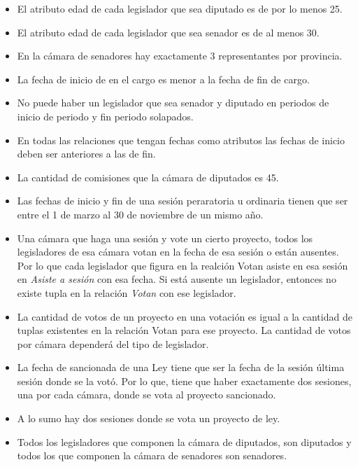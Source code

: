 \begin{itemize}
	\item El atributo edad de cada legislador que sea diputado es de por lo menos 25.
	\item El atributo edad de cada legislador que sea senador es de al menos 30.
	\item En la c\'amara de senadores hay exactamente 3 representantes por provincia.
	\item La fecha de inicio de en el cargo es menor a la fecha de fin de cargo.
	\item No puede haber un legislador que sea senador y diputado en periodos de
	 inicio de periodo y fin periodo solapados.
	
	\item En todas las relaciones que tengan fechas como atributos las fechas de inicio
	 deben ser anteriores a las de fin.
	
	\item La cantidad de comisiones que la c\'amara de diputados es 45.
	
	\item Las fechas de inicio y fin de una sesi\'on peraratoria u ordinaria tienen que ser entre el 1 de marzo al 30 de noviembre de un mismo a\~no.
	
	\item Una c\'amara que haga una sesi\'on y vote un cierto proyecto, todos los legisladores de esa c\'amara votan en la fecha de esa sesi\'on o est\'an ausentes. Por lo que cada legislador que figura en la realci\'on Votan asiste en esa sesi\'on en \textit{Asiste a sesi\'on} con esa fecha. Si est\'a ausente un legislador, entonces no existe tupla en la relaci\'on \textit{Votan} con ese legislador.
	
	\item La cantidad de votos de un proyecto en una votaci\'on es igual a la cantidad de tuplas existentes en la relaci\'on Votan para ese proyecto. La cantidad de votos por c\'amara depender\'a del tipo de legislador.
	
	\item La fecha de sancionada de una Ley tiene que ser la fecha de la sesi\'on \'ultima sesi\'on donde se la vot\'o. Por lo que, tiene que haber exactamente dos sesiones, una por cada c\'amara, donde se vota al proyecto sancionado.
	
	\item A lo sumo hay dos sesiones donde se vota un proyecto de ley.
	
	\item Todos los legisladores que componen la c\'amara de diputados, son diputados y todos los que componen la c\'amara de senadores son senadores.


\end{itemize}
